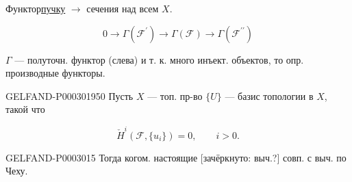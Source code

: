 Функтор\quad\underline{пучку} $\longrightarrow$ сечения над всем $X$.

\begin{equation*}0\longrightarrow\Gamma(\mathcal F^{\prime})\longrightarrow\Gamma(\mathcal F)\longrightarrow\Gamma(\mathcal F^{\prime\prime})\end{equation*}

$\Gamma$ --- полуточн. функтор (слева) и т. к. много инъект. объектов,
то опр. производные функторы.

\begin{GelfandAdjacentEvidence}{GELFAND-P000301}{950}
Пусть $X$ --- топ. пр-во $\{U\}$ --- базис топологии в $X$,
такой что

\begin{equation*}\check H^i(\mathcal F,\{u_i\})=0,\qquad i>0.\end{equation*}\end{GelfandAdjacentEvidence}

\begin{GelfandAdjacentEvidence}{GELFAND-P000301}{5}
Тогда когом. настоящие [зачёркнуто: выч.?] совп. с выч. по Чеху.

\end{GelfandAdjacentEvidence}


